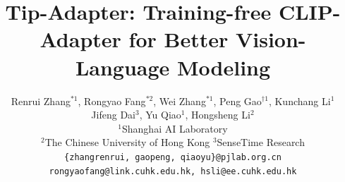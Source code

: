 \documentclass[10pt,twocolumn,letterpaper]{article}
\begin{document}
\title{Tip-Adapter: Training-free CLIP-Adapter for Better Vision-Language Modeling}


\author{Renrui Zhang$^{*1}$, Rongyao Fang$^{*2}$,  Wei Zhang$^{*1}$, Peng Gao$^{\dagger 1}$, Kunchang Li$^1$\\ Jifeng Dai$^3$, Yu Qiao$^1$, Hongsheng Li$^{2}$\\ 
  $^1$Shanghai AI Laboratory \quad \\
  $^2$The Chinese University of Hong Kong  \quad
  $^3$SenseTime Research\\
\texttt{\{zhangrenrui, gaopeng, qiaoyu\}@pjlab.org.cn} \\
\texttt{rongyaofang@link.cuhk.edu.hk, hsli@ee.cuhk.edu.hk}
}
\end{document}
